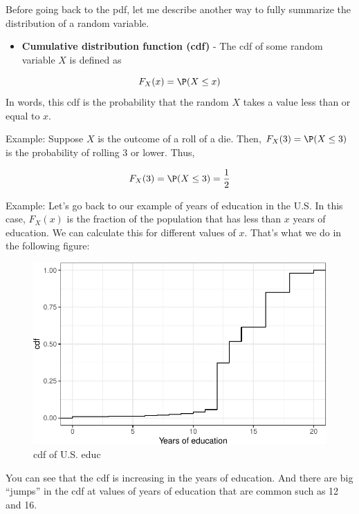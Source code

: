 \documentclass[
  letterpaper,
  DIV=11,
  numbers=noendperiod]{scrreprt}
\providecommand{\tightlist}{%
  \setlength{\itemsep}{0pt}\setlength{\parskip}{0pt}}\usepackage{longtable,booktabs,array}
\begin{document}
Before going back to the pdf, let me describe another way to fully
summarize the distribution of a random variable.

\begin{itemize}
\tightlist
\item
  \textbf{Cumulative distribution function (cdf)} - The cdf of some
  random variable \(X\) is defined as
\end{itemize}

\[
  F_X(x) = \P(X \leq x)
\] In words, this cdf is the probability that the random \(X\) takes a
value less than or equal to \(x\).

{Example: } Suppose \(X\) is the outcome of a roll of a die. Then,
\(F_X(3) = \P(X \leq 3)\) is the probability of rolling 3 or lower.
Thus,

\[
  F_X(3) = \P(X \leq 3) = \frac{1}{2}
\]

{Example: } Let's go back to our example of years of education in the
U.S. In this case, \(F_X(x)\) is the fraction of the population that has
less than \(x\) years of education. We can calculate this for different
values of \(x\). That's what we do in the following figure:

\begin{figure}[H]

{\centering \includegraphics{03-random_variables_files/figure-pdf/unnamed-chunk-4-1.pdf}

}

\caption{cdf of U.S. educ}

\end{figure}%

You can see that the cdf is increasing in the years of education. And
there are big ``jumps'' in the cdf at values of years of education that
are common such as 12 and 16.
\end{document}
